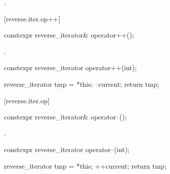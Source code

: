 \begin{itemdescr}
\pnum
\returns {}.
\end{itemdescr}

[reverse.iter.op++]{}

%
\begin{itemdecl}
constexpr reverse_iterator& operator++();
\end{itemdecl}

\begin{itemdescr}
\pnum
\effects
{}

\pnum
\returns
{}.
\end{itemdescr}

%
%
\begin{itemdecl}
constexpr reverse_iterator operator++(int);
\end{itemdecl}

\begin{itemdescr}
\pnum
\effects
\begin{codeblock}
reverse_iterator tmp = *this;
--current;
return tmp;
\end{codeblock}
\end{itemdescr}

[reverse.iter.op\dcr]{}

%
\begin{itemdecl}
constexpr reverse_iterator& operator--();
\end{itemdecl}

\begin{itemdescr}
\pnum
\effects
{}

\pnum
\returns
{}.
\end{itemdescr}

%
%
\begin{itemdecl}
constexpr reverse_iterator operator--(int);
\end{itemdecl}

\begin{itemdescr}
\pnum
\effects
\begin{codeblock}
reverse_iterator tmp = *this;
++current;
return tmp;
\end{codeblock}
\end{itemdescr}

